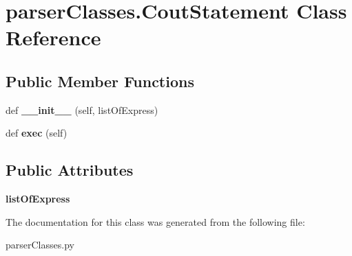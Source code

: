 \hypertarget{classparser_classes_1_1_cout_statement}{}\section{parser\+Classes.\+Cout\+Statement Class Reference}
\label{classparser_classes_1_1_cout_statement}
\subsection*{Public Member Functions}
\begin{DoxyCompactItemize}
\item 
def {\bfseries \+\_\+\+\_\+init\+\_\+\+\_\+} (self, list\+Of\+Express)\hypertarget{classparser_classes_1_1_cout_statement_ad06ead1f60e93546e7445ce5d0219504}{}\label{classparser_classes_1_1_cout_statement_ad06ead1f60e93546e7445ce5d0219504}

\item 
def {\bfseries exec} (self)\hypertarget{classparser_classes_1_1_cout_statement_a8a94c5c6abe84a07b91e3558a39fa640}{}\label{classparser_classes_1_1_cout_statement_a8a94c5c6abe84a07b91e3558a39fa640}

\end{DoxyCompactItemize}
\subsection*{Public Attributes}
\begin{DoxyCompactItemize}
\item 
{\bfseries list\+Of\+Express}\hypertarget{classparser_classes_1_1_cout_statement_a07537d9231860bf00d245bcca3766986}{}\label{classparser_classes_1_1_cout_statement_a07537d9231860bf00d245bcca3766986}

\end{DoxyCompactItemize}


The documentation for this class was generated from the following file\+:\begin{DoxyCompactItemize}
\item 
parser\+Classes.\+py\end{DoxyCompactItemize}
